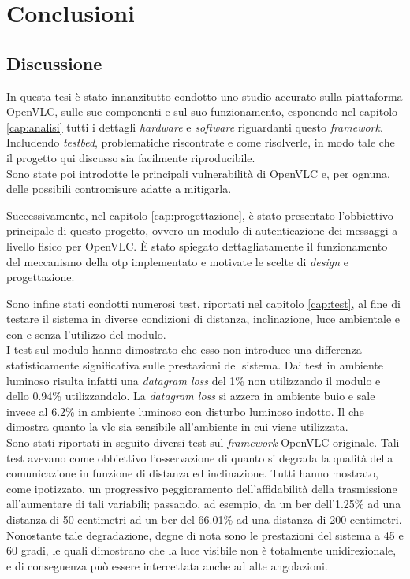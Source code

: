 \chapter{Conclusioni}
\label{cap:conclusioni}

\section{Discussione}
In questa tesi è stato innanzitutto condotto uno studio accurato sulla piattaforma OpenVLC, sulle sue componenti e sul suo funzionamento, esponendo nel capitolo \ref{cap:analisi} tutti i dettagli \textit{hardware} e \textit{software} riguardanti questo \textit{framework}. Includendo \textit{testbed}, problematiche riscontrate e come risolverle, in modo tale che il progetto qui discusso sia facilmente riproducibile.\\
Sono state poi introdotte le principali vulnerabilità di OpenVLC e, per ognuna, delle possibili contromisure adatte a mitigarla.

Successivamente, nel capitolo \ref{cap:progettazione}, è stato presentato l'obbiettivo principale di questo progetto, ovvero un modulo di autenticazione dei messaggi a livello fisico per OpenVLC. È stato spiegato dettagliatamente il funzionamento del meccanismo della \gls{otp} implementato e motivate le scelte di \textit{design} e progettazione.

Sono infine stati condotti numerosi test, riportati nel capitolo \ref{cap:test}, al fine di testare il sistema in diverse condizioni di distanza, inclinazione, luce ambientale e con e senza l'utilizzo del modulo.\\
I test sul modulo hanno dimostrato che esso non introduce una differenza statisticamente significativa sulle prestazioni del sistema. Dai test in ambiente luminoso risulta infatti una \textit{datagram loss} del 1\% non utilizzando il modulo e dello 0.94\% utilizzandolo. La \textit{datagram loss} si azzera in ambiente buio e sale invece al 6.2\% in ambiente luminoso con disturbo luminoso indotto. Il che dimostra quanto la \gls{vlc} sia sensibile all'ambiente in cui viene utilizzata.\\
Sono stati riportati in seguito diversi test sul \textit{framework} OpenVLC originale. Tali test avevano come obbiettivo l'osservazione di quanto si degrada la qualità della comunicazione in funzione di distanza ed inclinazione. Tutti hanno mostrato, come ipotizzato, un progressivo peggioramento dell'affidabilità della trasmissione all'aumentare di tali variabili; passando, ad esempio, da un \gls{ber} dell'1.25\% ad una distanza di 50 centimetri ad un \gls{ber} del 66.01\% ad una distanza di 200 centimetri. Nonostante tale degradazione, degne di nota sono le prestazioni del sistema a 45 e 60 gradi, le quali dimostrano che la luce visibile non è totalmente unidirezionale, e di conseguenza può essere intercettata anche ad alte angolazioni.

